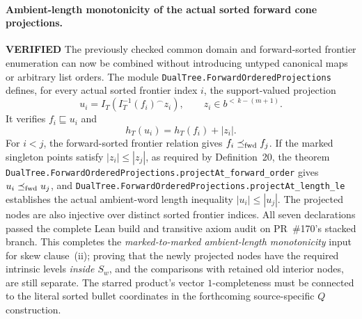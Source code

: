 \documentclass[11pt]{article}
\newcommand{\ok}{\textcolor{green!40!black}{\textbf{VERIFIED}}}
\newcommand{\lean}[1]{\texttt{#1}}
\begin{document}
\paragraph{Ambient-length monotonicity of the actual sorted forward cone projections.} \ok
The previously checked common domain and
forward-sorted frontier enumeration can now
be combined without introducing untyped
canonical maps or arbitrary list orders.
The module \lean{DualTree.ForwardOrderedProjections}
defines, for every actual sorted frontier
index $i$, the support-valued projection
\[
 u_i=I_T(I_T^{-1}(f_i)^\frown z_i),
 \qquad z_i\in b^{<\,k-(m+1)}.
\]
It verifies $f_i\sqsubseteq u_i$ and
\[
 h_T(u_i)=h_T(f_i)+|z_i|.
\]
For $i<j$, the forward-sorted frontier
relation gives $f_i\preceq_{\rm fwd} f_j$.
If the marked singleton points satisfy
$|z_i|\le |z_j|$, as required by
Definition~20, the theorem
\lean{DualTree.ForwardOrderedProjections.projectAt_forward_order}
gives $u_i\preceq_{\rm fwd}u_j$,
and \lean{DualTree.ForwardOrderedProjections.projectAt_length_le}
establishes the actual ambient-word
length inequality $|u_i|\le |u_j|$.
The projected nodes are also injective
over distinct sorted frontier indices.
All seven declarations passed the complete Lean build and transitive
axiom audit on PR~\#170's stacked branch.
This completes the \emph{marked-to-marked
ambient-length monotonicity} input
for skew clause~(ii); proving that the
newly projected nodes have the required
intrinsic levels \emph{inside $S_w$}, and
the comparisons with retained old
interior nodes, are still separate.
The starred product's vector
$1$-completeness must be connected
to the literal sorted bullet
coordinates in the forthcoming
source-specific $Q$ construction.
\end{document}
